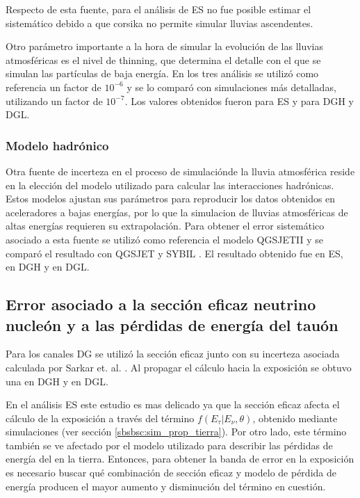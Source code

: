		Respecto de esta fuente, para el análisis de ES no fue posible estimar el sistemático debido a que {\sc corsika} no permite simular lluvias ascendentes. 
		
		Otro parámetro importante a la hora de simular la evolución de las lluvias atmosféricas es el nivel de thinning, que determina el detalle con el que se simulan las partículas de baja energía.
		En los tres análisis se utilizó como referencia un factor de $10^{-6}$ y se lo comparó con simulaciones más detalladas, utilizando un factor de $10^{-7}$.
		Los valores obtenidos fueron  para ES y  para DGH y DGL.
		
		\subsubsection{Modelo hadrónico}
		
		Otra fuente de incerteza en el proceso de simulaciónde la lluvia atmosférica reside en la elección del modelo utilizado para calcular las interacciones hadrónicas.
		Estos modelos ajustan sus parámetros para reproducir los datos obtenidos en aceleradores a bajas energías, por lo que la simulacion de lluvias atmosféricas de altas energías requieren su extrapolación.
		Para obtener el error sistemático asociado a esta fuente se utilizó como referencia el modelo QGSJETII \cite{cite:QGSJETII} y se comparó el resultado con QGSJET \cite{cite:QGSJET} y SYBIL \cite{cite:SIBYLL}.
		El resultado obtenido fue  en ES,  en DGH y  en DGL.
		
	\subsection{Error asociado a la sección eficaz neutrino nucleón y a las pérdidas de energía del tauón}
	
	Para los canales DG se utilizó la sección eficaz junto con su incerteza asociada calculada por Sarkar et. al. \cite{cite:cooper_sarkar}.
	Al propagar el cálculo hacia la exposición se obtuvo una  en DGH y  en DGL.
	
	En el an\'alisis ES este estudio es mas delicado ya que la sección eficaz afecta el cálculo de la exposición a través del término $f(E_\tau|E_\nu,\theta)$, obtenido mediante simulaciones (ver sección \ref{sbsbsc:sim_prop_tierra}).
	Por otro lado, este término también se ve afectado por el modelo utilizado para describir las pérdidas de energía del \tauon{} en la tierra.
	Entonces, para obtener la banda de error en la exposición es necesario buscar qué combinación de sección eficaz y modelo de pérdida de energía producen el mayor aumento y disminución del término en cuestión.
	
